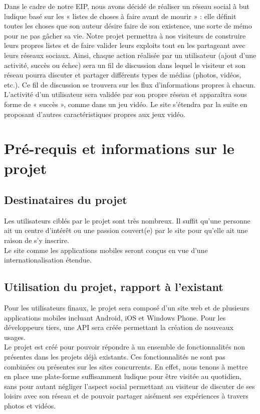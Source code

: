 \documentclass{life-fr}
\begin{document}
Dans le cadre de notre EIP, nous avons décidé de réaliser un réseau social à but ludique basé sur les « listes de choses à faire avant de mourir » : elle définit toutes les choses que son auteur désire faire de son existence, une sorte de mémo pour ne pas gâcher sa vie. Notre projet permettra à nos visiteurs de construire leurs propres listes et de faire valider leurs exploits tout en les partageant avec leurs réseaux sociaux. Ainsi, chaque action réalisée par un utilisateur (ajout d'une activité, succès ou échec) sera un fil de discussion dans lequel le visiteur et son réseau pourra discuter et partager différents types de médias (photos, vidéos, etc.). Ce fil de discussion se trouvera sur les flux d'informations propres à chacun. L'activité d'un utilisateur sera validée par son propre réseau et apparaîtra sous forme de « succès », comme dans un jeu vidéo. Le site s'étendra par la suite en proposant d'autres caractéristiques propres aux jeux vidéo.


\chapter{Pré-requis et informations sur le projet}

\section{Destinataires du projet}

Les utilisateurs ciblés par le projet sont très nombreux. Il suffit qu'une personne ait un centre d'intérêt ou une passion couvert(e) par le site pour qu'elle ait une raison de s'y inscrire.\\

Le site comme les applications mobiles seront conçus en vue d'une internationalisation étendue.

\section{Utilisation du projet, rapport à l'existant}

Pour les utilisateurs finaux, le projet sera composé d'un site web et de plusieurs applications mobiles incluant Android, iOS et Windows Phone. Pour les développeurs tiers, une API sera créée permettant la création de nouveaux usages.\\

Le projet est créé pour pouvoir répondre à un ensemble de fonctionnalités non présentes dans les projets déjà existants. Ces fonctionnalités ne sont pas combinées ou présentes sur les sites concurrents. En effet, nous tenons à mettre en place une plate-forme suffisamment ludique pour être visitée au quotidien, sans pour autant négliger l’aspect social permettant au visiteur de discuter de ses loisirs avec son réseau et de pouvoir partager aisément ses expériences à travers photos et vidéos.\\
\end{document}
